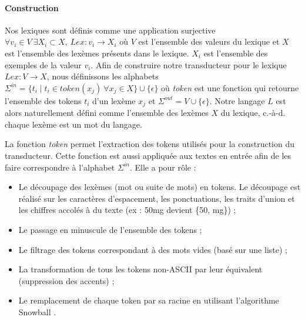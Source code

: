 \paragraph{Construction}
Nos lexiques sont définis comme une application surjective $\forall v_i \in V\ \exists X_i \subset X,\ Lex: v_i \rightarrow X_i$ où $V$ est l'ensemble des valeurs du lexique et $X$ est l'ensemble des lexèmes présents dans le lexique.
$X_i$ est l'ensemble des exemples de la valeur $v_i$.
Afin de construire notre transducteur pour le lexique $Lex: V \rightarrow X$, nous définissons les alphabets $\Sigma^{in} = \{t_i \mid t_i \in \textit{token}(x_j)\ \forall x_j \in X\} \cup \{\epsilon\}$ où \textit{token} est une fonction qui retourne l'ensemble des tokens $t_i$ d'un lexème $x_j$ et $\Sigma^{out} = V \cup \{\epsilon\}$.
Notre langage $L$ est alors naturellement défini comme l'ensemble des lexèmes $X$ du lexique, c.-à-d. chaque lexème est un mot du langage.

La fonction \textit{token} permet l'extraction des tokens utilisés pour la construction du transducteur.
Cette fonction est aussi appliquée aux textes en entrée afin de les faire correspondre à l'alphabet $\Sigma^{in}$.
Elle a pour rôle :
\begin{itemize}
    \item Le découpage des lexèmes (mot ou suite de mots) en tokens.
          Le découpage est réalisé sur les caractères d'espacement, les ponctuations, les traits d'union et les chiffres accolés à du texte (ex : 50mg devient \{50, mg\}) ;  %
    \item Le passage en minuscule de l'ensemble des tokens ;                                                                                                                  %
    \item Le filtrage des tokens correspondant à des mots vides (basé sur une liste) ;                                                                                        %
    \item La transformation de tous les tokens non-ASCII par leur équivalent (suppression des accents) ;                                                                      %
    \item Le remplacement de chaque token par sa racine en utilisant l'algorithme Snowball \cite{porterSnowballLanguageStemming2001}.                                         %
\end{itemize}

